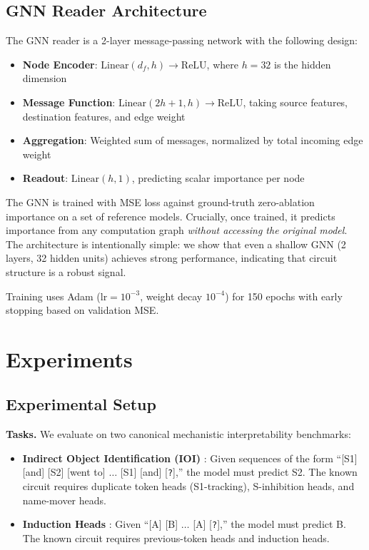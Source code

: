 \documentclass[11pt,a4paper]{article}
\begin{document}
\subsection{GNN Reader Architecture}

The GNN reader is a 2-layer message-passing network with the following design:

\begin{itemize}[leftmargin=*]
    \item \textbf{Node Encoder}: $\text{Linear}(d_f, h) \to \text{ReLU}$, where $h = 32$ is the hidden dimension
    \item \textbf{Message Function}: $\text{Linear}(2h + 1, h) \to \text{ReLU}$, taking source features, destination features, and edge weight
    \item \textbf{Aggregation}: Weighted sum of messages, normalized by total incoming edge weight
    \item \textbf{Readout}: $\text{Linear}(h, 1)$, predicting scalar importance per node
\end{itemize}

The GNN is trained with MSE loss against ground-truth zero-ablation importance on a set of reference models. Crucially, once trained, it predicts importance from any computation graph \emph{without accessing the original model}. The architecture is intentionally simple: we show that even a shallow GNN (2 layers, 32 hidden units) achieves strong performance, indicating that circuit structure is a robust signal.

Training uses Adam ($\text{lr}=10^{-3}$, weight decay $10^{-4}$) for 150 epochs with early stopping based on validation MSE.

\section{Experiments}

\subsection{Experimental Setup}

\textbf{Tasks.} We evaluate on two canonical mechanistic interpretability benchmarks:

\begin{itemize}[leftmargin=*]
    \item \textbf{Indirect Object Identification (IOI)} \cite{wang2023interpretability}: Given sequences of the form ``[S1] [and] [S2] [went to] $\ldots$ [S1] [and] [\texttt{?}],'' the model must predict S2. The known circuit requires duplicate token heads (S1-tracking), S-inhibition heads, and name-mover heads.
    \item \textbf{Induction Heads} \cite{olsson2022incontext}: Given ``[A] [B] $\ldots$ [A] [\texttt{?}],'' the model must predict B. The known circuit requires previous-token heads and induction heads.
\end{itemize}
\end{document}

